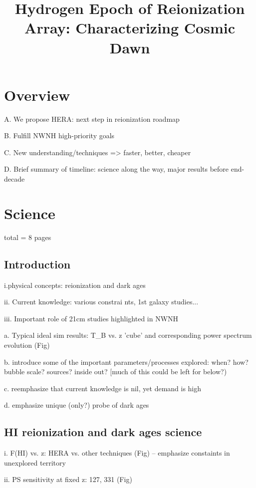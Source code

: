 \documentclass[preprint]{aastex}
\begin{document}
\title{Hydrogen Epoch of Reionization Array: Characterizing Cosmic Dawn}

\section{Overview} %

A. We propose HERA: next step in reionization roadmap

B. Fulfill NWNH high-priority goals

C. New understanding/techniques => faster, better, cheaper

D. Brief summary of timeline: science along the way, major results before end-decade

\section{Science} total = 8 pages

\subsection{Introduction}    %

i.physical concepts: reionization and dark ages

ii. Current knowledge: various constrai	nts, 1st galaxy studies...

iii. Important role of 21cm studies highlighted in NWNH

a. Typical ideal sim results: T_B vs. z 'cube' and corresponding power spectrum evolution (Fig)

b. introduce some of the important parameters/processes explored: when? how?
bubble scale? sources? inside out? [much of this could be left for below?)

c. reemphasize that current knowledge is nil, yet demand is high

d. emphasize unique (only?) probe of dark ages

\subsection{HI reionization and dark ages science} %

i. F(HI) vs. z: HERA vs. other techniques (Fig) -- emphasize constaints in unexplored territory

ii. PS sensitivity at fixed z: 127, 331 (Fig)
\end{document}
